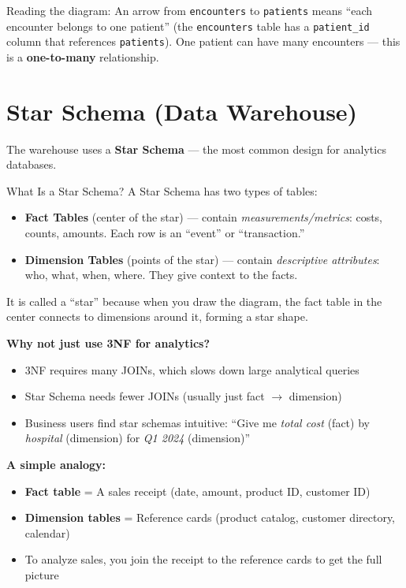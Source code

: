 \documentclass[12pt, a4paper, oneside]{report}
\begin{document}
\begin{notebox}
    Reading the diagram: An arrow from \texttt{encounters} to \texttt{patients} means ``each encounter belongs to one patient'' (the \texttt{encounters} table has a \texttt{patient\_id} column that references \texttt{patients}). One patient can have many encounters --- this is a \textbf{one-to-many} relationship.
\end{notebox}

\section{Star Schema (Data Warehouse)}
\label{sec:star-schema}

The warehouse uses a \textbf{Star Schema} --- the most common design for analytics databases.

\begin{conceptbox}{What Is a Star Schema?}
A Star Schema has two types of tables:
\begin{itemize}
    \item \textbf{Fact Tables} (center of the star) --- contain \textit{measurements/metrics}: costs, counts, amounts. Each row is an ``event'' or ``transaction.''
    \item \textbf{Dimension Tables} (points of the star) --- contain \textit{descriptive attributes}: who, what, when, where. They give context to the facts.
\end{itemize}

It is called a ``star'' because when you draw the diagram, the fact table in the center connects to dimensions around it, forming a star shape.

\textbf{Why not just use 3NF for analytics?}
\begin{itemize}
    \item 3NF requires many JOINs, which slows down large analytical queries
    \item Star Schema needs fewer JOINs (usually just fact $\rightarrow$ dimension)
    \item Business users find star schemas intuitive: ``Give me \textit{total cost} (fact) by \textit{hospital} (dimension) for \textit{Q1 2024} (dimension)''
\end{itemize}

\textbf{A simple analogy:}
\begin{itemize}
    \item \textbf{Fact table} = A sales receipt (date, amount, product ID, customer ID)
    \item \textbf{Dimension tables} = Reference cards (product catalog, customer directory, calendar)
    \item To analyze sales, you join the receipt to the reference cards to get the full picture
\end{itemize}
\end{conceptbox}
\end{document}
